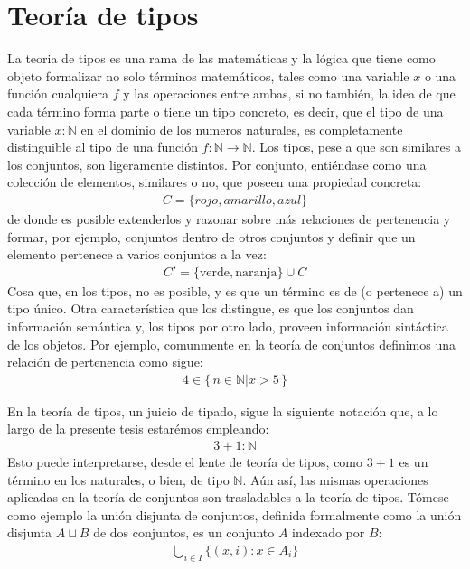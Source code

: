 \section{Teoría de tipos}
La teoria de tipos es una rama de las matemáticas y la lógica que tiene como objeto formalizar no solo términos matemáticos, tales como una variable $x$ o una función cualquiera $f$ y las operaciones entre ambas, si no también, la idea de que cada término forma parte o tiene un tipo concreto, es decir, que el tipo de una variable $x : \mathbb{N}$ en el dominio de los numeros naturales, es completamente distinguible al tipo de una función $f : \mathbb{N} \to \mathbb{N}$.
\newline
\newline
\indent Los tipos, pese a que son similares a los conjuntos, son ligeramente distintos. Por conjunto, entiéndase como una colección de elementos, similares o no, que poseen una propiedad concreta:
\begin{align}
  C = \{rojo, amarillo, azul\}
\end{align}
de donde es posible extenderlos y razonar sobre más relaciones de pertenencia y formar, por ejemplo, conjuntos dentro de otros conjuntos y definir que un elemento pertenece a varios conjuntos a la vez:
\begin{align}
  C' = \{\text{verde}, \text{naranja}\} \cup C
\end{align}
Cosa que, en los tipos, no es posible, y es que un término es de (o pertenece a) un tipo único. Otra característica que los distingue, es que los conjuntos dan información semántica y, los tipos por otro lado, proveen información sintáctica de los objetos. Por ejemplo, comunmente en la teoría de conjuntos definimos una relación de pertenencia como sigue:
\begin{align}
  4 \in \{\,n \in \mathbb{N} | x > 5 \,\}
\end{align}

En la teoría de tipos, un juicio de tipado, sigue la siguiente notación que, a lo largo de la presente tesis estarémos empleando:
\begin{align}
  3 + 1 : \mathbb{N}
\end{align}
Esto puede interpretarse, desde el lente de teoría de tipos, como $3 + 1$ es un término en los naturales, o bien, de tipo $\mathbb{N}$. Aún así, las mismas operaciones aplicadas en la teoría de conjuntos son trasladables a la teoría de tipos. Tómese como ejemplo la unión disjunta de conjuntos, definida formalmente como la unión disjunta $A \sqcup B$ de dos conjuntos, es un conjunto $A$ indexado por $B$: 
\begin{align}
\bigcup_{i \in I} \{ (x, i) : x \in A_i \}
\end{align}

